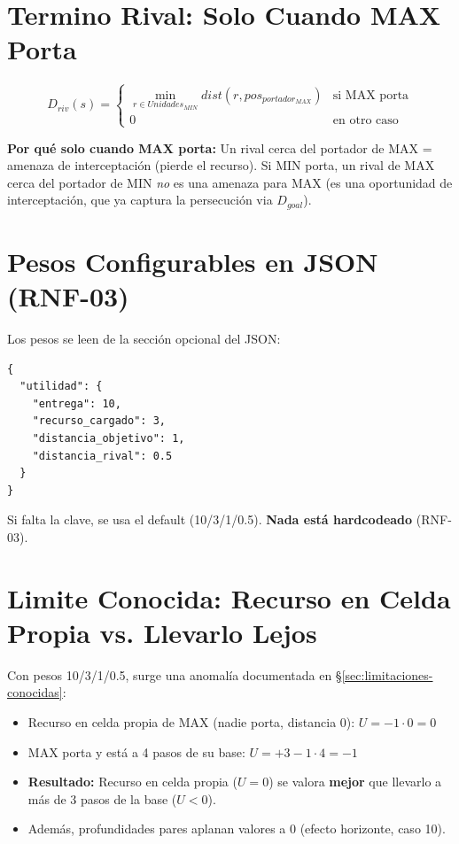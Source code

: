 \section{Termino Rival: Solo Cuando MAX Porta}
\label{sec:termino-rival}

\begin{equation}
D_{riv}(s) = \begin{cases}
\min_{r \in Unidades_{MIN}} dist(r, pos_{portador_{MAX}}) & \text{si MAX porta} \\
0 & \text{en otro caso}
\end{cases}
\end{equation}

\textbf{Por qué solo cuando MAX porta:} Un rival cerca del portador de MAX = amenaza de
interceptación (pierde el recurso). Si MIN porta, un rival de MAX cerca del portador de MIN
\textit{no} es una amenaza para MAX (es una oportunidad de interceptación, que ya captura la
persecución via $D_{goal}$).

\section{Pesos Configurables en JSON (RNF-03)}
\label{sec:pesos-json}

Los pesos se leen de la sección opcional  del JSON:

\begin{verbatim}
{
  "utilidad": {
    "entrega": 10,
    "recurso_cargado": 3,
    "distancia_objetivo": 1,
    "distancia_rival": 0.5
  }
}
\end{verbatim}

Si falta la clave, se usa el default (10/3/1/0.5). \textbf{Nada está hardcodeado} (RNF-03).

\section{Limite Conocida: Recurso en Celda Propia vs. Llevarlo Lejos}
\label{sec:limitacion-utilidad}

Con pesos 10/3/1/0.5, surge una anomalía documentada en \S\ref{sec:limitaciones-conocidas}:

\begin{itemize}
\item Recurso en celda propia de MAX (nadie porta, distancia 0): $U = -1 \cdot 0 = 0$
\item MAX porta y está a 4 pasos de su base: $U = +3 - 1\cdot4 = -1$
\item \textbf{Resultado:} Recurso en celda propia ($U=0$) se valora \textbf{mejor} que llevarlo
  a más de 3 pasos de la base ($U < 0$).
\item Además, profundidades pares aplanan valores a 0 (efecto horizonte, caso 10).
\end{itemize}

